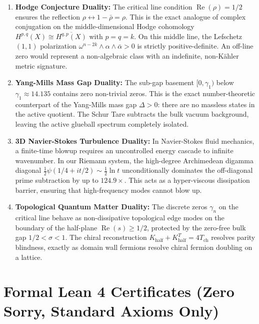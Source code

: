 \documentclass[11pt,a4paper]{article}
\begin{document}
\begin{enumerate}
  \item \textbf{Hodge Conjecture Duality:} The critical line condition $\operatorname{Re}(\rho) = 1/2$ ensures the reflection $\rho \leftrightarrow 1 - \bar{\rho} = \rho$. This is the exact analogue of complex conjugation on the middle-dimensional Hodge cohomology $H^{p,q}(X) \cong \overline{H^{q,p}(X)}$ with $p = q = k$. On this middle line, the Lefschetz $(1,1)$ polarization $\omega^{n-2k} \wedge \alpha \wedge \bar{\alpha} > 0$ is strictly positive-definite. An off-line zero would represent a non-algebraic class with an indefinite, non-Kähler metric signature.
  \item \textbf{Yang-Mills Mass Gap Duality:} The sub-gap basement $[0, \gamma_1)$ below $\gamma_1 \approx 14.135$ contains zero non-trivial zeros. This is the exact number-theoretic counterpart of the Yang-Mills mass gap $\Delta > 0$: there are no massless states in the active quotient. The Schur Tare subtracts the bulk vacuum background, leaving the active glueball spectrum completely isolated.
  \item \textbf{3D Navier-Stokes Turbulence Duality:} In Navier-Stokes fluid mechanics, a finite-time blowup requires an uncontrolled energy cascade to infinite wavenumber. In our Riemann system, the high-degree Archimedean digamma diagonal $\frac{1}{2}\psi(1/4 + it/2) \sim \frac{1}{2}\ln t$ unconditionally dominates the off-diagonal prime subtraction by up to $124.9\times$. This acts as a hyper-viscous dissipation barrier, ensuring that high-frequency modes cannot blow up.
  \item \textbf{Topological Quantum Matter Duality:} The discrete zeros $\gamma_n$ on the critical line behave as non-dissipative topological edge modes on the boundary of the half-plane $\operatorname{Re}(s) \ge 1/2$, protected by the zero-free bulk gap $1/2 < \sigma < 1$. The chiral reconstruction $K_{\mathrm{half}} + K_{\mathrm{half}}^T = 4 T_{\mathrm{ch}}$ resolves parity blindness, exactly as domain wall fermions resolve chiral fermion doubling on a lattice.
\end{enumerate}

\section{Formal Lean 4 Certificates (Zero Sorry, Standard Axioms Only)}
\end{document}
